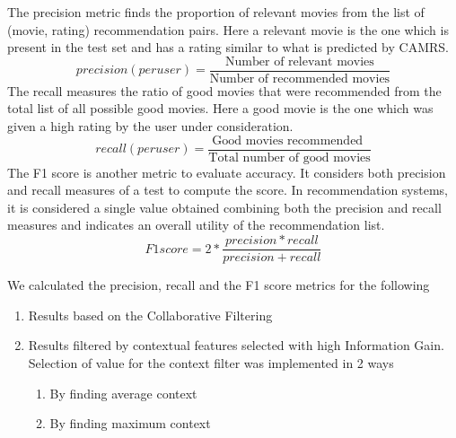 \documentclass{article}
\begin{document}
The precision metric finds the proportion of relevant movies from the list of (movie, rating) recommendation pairs. Here a relevant movie   is the one which is present in the test set and has a rating similar to what is predicted by CAMRS.
\begin{equation}
precision (per user) = \frac{\text{Number of relevant movies}} {\text{Number of recommended movies}}
\end{equation} 
The recall measures the ratio of good movies that were recommended from the total list of all possible good movies. Here a good movie is the one which was given a high rating by the user under consideration.
\begin{equation}
recall (per user) = \frac{\text{Good movies recommended }}{\text{Total number of good movies}}
\end{equation}
 The F1 score is another metric to evaluate accuracy.  It considers both precision and recall measures of a test to compute the score. In recommendation systems, it is considered a single value obtained combining both the precision and recall measures and indicates an overall utility of the recommendation list.
\begin{equation}
F1 score = 2 * \frac{precision * recall}{precision + recall}
\end{equation}

 We calculated the precision, recall and the F1 score metrics for the following 
\begin{enumerate} 
\item Results based on the Collaborative Filtering
\item Results filtered by contextual features selected with high Information Gain. Selection of value for the context filter was implemented in 2 ways
\begin{enumerate}
\item By finding average context 
\item By finding maximum context
\end{enumerate}
\end{enumerate}
\end{document}
